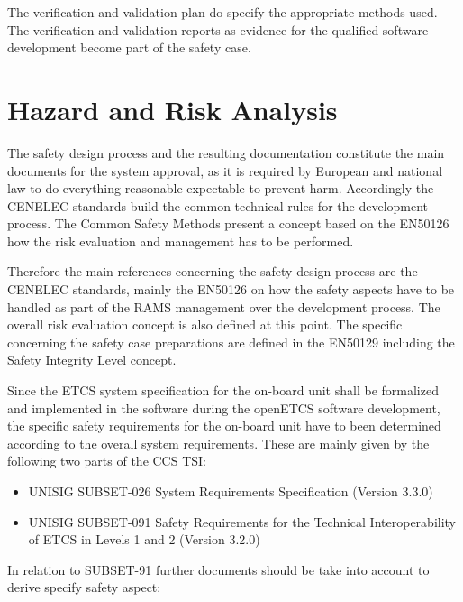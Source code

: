 \documentclass{template/openetcs_report}
\begin{document}
The verification and validation plan do specify the appropriate methods used. The verification and validation reports as evidence for the qualified software development become part of the safety case.


\chapter{Hazard and Risk Analysis}
\label{sec:hazardandrisk}
The safety design process and the resulting documentation constitute the main documents for the system approval, as it is required by European and national law to do everything reasonable expectable to prevent harm. Accordingly the CENELEC standards build the common technical rules for the development process. The Common Safety Methods present a concept based on the EN50126 how the risk evaluation and management has to be performed. 

Therefore the main references concerning the safety design process are the CENELEC standards, mainly the EN50126 on how the safety aspects have to be handled as part of the RAMS management over the development process. The overall risk evaluation concept is also defined at this point. The specific concerning the safety case preparations are defined in the EN50129 including the Safety Integrity Level concept. 

Since the ETCS system specification for the on-board unit shall be formalized and implemented in the software during the openETCS software development, the specific safety requirements for the on-board unit have to been determined according to the overall system requirements. These are mainly given by the following two parts of the CCS TSI:

\begin{itemize}
\item UNISIG SUBSET-026	System Requirements Specification 	(Version 3.3.0)
\item UNISIG SUBSET-091 Safety Requirements for the Technical Interoperability of ETCS in Levels 1 and 2 	(Version 3.2.0)
\end{itemize}

In relation to SUBSET-91 further documents should be take into account to derive specify safety aspect:
\end{document}
